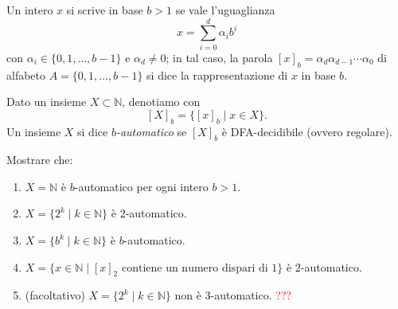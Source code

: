 \begin{ex}
Un intero $x$ si scrive in base $b>1$ se vale l'uguaglianza
\[
x=\sum_{i=0}^{d}\alpha_i b^i
\]
con $\alpha_i\in\{0,1,\dots,b-1\}$ e $\alpha_d\neq 0$; in tal caso, la parola
$[x]_b=\alpha_d\alpha_{d-1}\cdots\alpha_0$ di alfabeto $A=\{0,1,\dots,b-1\}$ si dice la
rappresentazione di $x$ in base $b$.

Dato un insieme $X\subset\mathbb{N}$, denotiamo con
\[
[X]_b=\{[x]_b\mid x\in X\}.
\]
Un insieme $X$ si dice \emph{$b$-automatico} se $[X]_b$ è DFA-decidibile (ovvero regolare).

Mostrare che:
\begin{enumerate}
    \item $X=\mathbb{N}$ è $b$-automatico per ogni intero $b>1$.
    \item $X=\{2^k\mid k\in\mathbb{N}\}$ è $2$-automatico.
    \item $X=\{b^k\mid k\in\mathbb{N}\}$ è $b$-automatico.
    \item $X=\{x\in\mathbb{N}\mid [x]_2 \text{ contiene un numero dispari di } 1\}$ è $2$-automatico.
    \item (facoltativo) $X=\{2^k\mid k\in\mathbb{N}\}$ non è $3$-automatico. \textcolor{red}{???}
\end{enumerate}
\end{ex}

